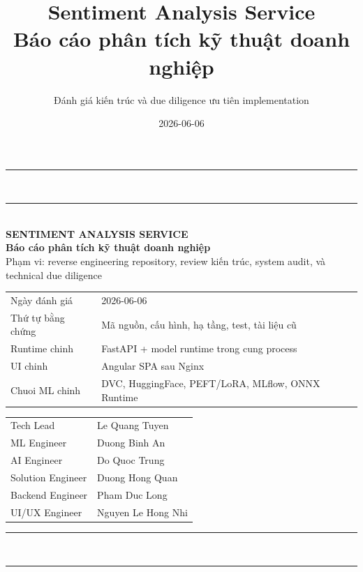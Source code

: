 
\ifPDFTeX
  
\fi

\title{\textbf{Sentiment Analysis Service}\\Báo cáo phân tích kỹ thuật doanh nghiệp}
\author{Đánh giá kiến trúc và due diligence ưu tiên implementation}
\date{2026-06-06}



\begin{titlepage}
\thispagestyle{empty}
\centering
{\color{NavyBlue}\rule{\linewidth}{3pt}}\\[0.4em]
{\color{SteelBlue}\rule{\linewidth}{1pt}}\\[1.0cm]
{\Large\bfseries\color{NavyBlue} SENTIMENT ANALYSIS SERVICE}\\[0.25em]
{\large\bfseries Báo cáo phân tích kỹ thuật doanh nghiệp}\\[0.35em]
{\normalsize Phạm vi: reverse engineering repository, review kiến trúc, system audit, và technical due diligence}\\[0.9cm]

\begin{tabular}{@{}ll@{}}
Ngày đánh giá & 2026-06-06 \\
Thứ tự bằng chứng & Mã nguồn, cấu hình, hạ tầng, test, tài liệu cũ \\
Runtime chinh & FastAPI + model runtime trong cung process \\
UI chinh & Angular SPA sau Nginx \\
Chuoi ML chinh & DVC, HuggingFace, PEFT/LoRA, MLflow, ONNX Runtime \\
\end{tabular}

\vspace{0.6cm}
\begin{tabular}{@{}ll@{}}
Tech Lead & Le Quang Tuyen \\
ML Engineer & Duong Binh An \\
AI Engineer & Do Quoc Trung \\
Solution Engineer & Duong Hong Quan \\
Backend Engineer & Pham Duc Long \\
UI/UX Engineer & Nguyen Le Hong Nhi \\
\end{tabular}

\vfill
{}
\vfill
{\color{SteelBlue}\rule{\linewidth}{1pt}}\\[0.25em]
{\color{NavyBlue}\rule{\linewidth}{3pt}}
\end{titlepage}

